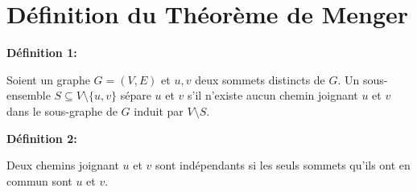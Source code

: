 \section{Définition du Théorème de Menger}

\textbf{Définition 1:}

Soient un graphe $G = (V,E)$ et $u, v$ deux sommets distincts de $G$. Un sous-ensemble $S \subseteq V \setminus \{u, v\}$ sépare $u$ et $v$ s'il n'existe aucun chemin joignant $u$ et $v$ dans le sous-graphe de $G$ induit par $V \setminus S$.

\textbf{Définition 2:}

Deux chemins joignant $u$ et $v$ sont indépendants si les seuls sommets qu'ils ont en commun sont $u$ et $v$.
